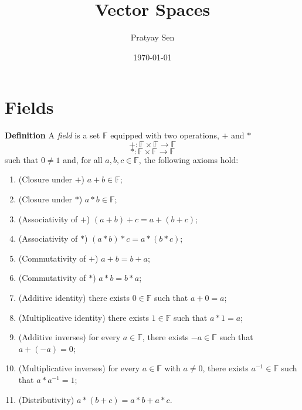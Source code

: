 \documentclass[a4paper,11pt,abstract=true]{scrartcl}
\theoremstyle{dotlessP}
\theoremstyle{dotlessS}
\theoremstyle{remark}
\theoremstyle{definition}
\begin{document}


\title{Vector Spaces}
\author{Pratyay Sen}
\date{\today}

\maketitle

\tableofcontents

\clearpage



\section{Fields}

\textbf{Definition} A \emph{field} is a set $\mathbb{F}$ equipped with two operations,
$+$ and $*$
\[
+:\mathbb{F}\times \mathbb{F}\longrightarrow \mathbb{F}
\]
\[
*:\mathbb{F}\times \mathbb{F}\longrightarrow \mathbb{F}
\]
such that $0\neq1$ and, for all $a,b,c\in \mathbb{F}$, the following axioms hold:
\begin{enumerate}
    \item (Closure under $+$) $a+b\in \mathbb{F}$;
    \item (Closure under $*$) $a*b\in \mathbb{F}$;
    \item (Associativity of $+$) $(a+b)+c=a+(b+c)$;
    \item (Associativity of $*$) $(a*b)*c=a*(b*c)$;
    \item (Commutativity of $+$) $a+b=b+a$;
    \item (Commutativity of $*$) $a*b=b*a$;
    \item (Additive identity) there exists $0\in \mathbb{F}$ such that
    $a+0=a$;
    \item (Multiplicative identity) there exists $1\in \mathbb{F}$ such that
    $a*1=a$;
    \item (Additive inverses) for every $a\in \mathbb{F}$, there exists $-a\in \mathbb{F}$
    such that $a+(-a)=0$;
    \item (Multiplicative inverses) for every $a\in \mathbb{F}$ with $a\neq0$,
    there exists $a^{-1}\in \mathbb{F}$ such that $a*a^{-1}=1$;
    \item (Distributivity) $a*(b+c)=a*b+a*c$.
\end{enumerate}
\end{document}

